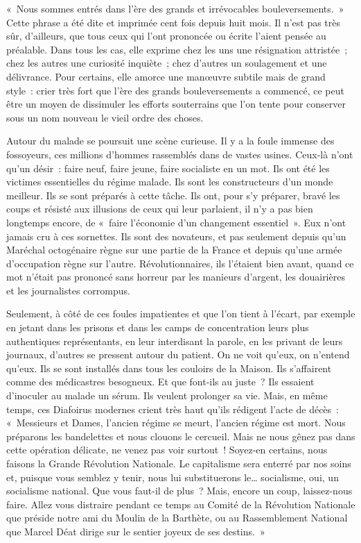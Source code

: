 \documentclass[french,twoside]{book} %
\newcommand\chaptercont{} %
\begin{document}
\chaptercont
\noindent « Nous sommes entrés dans l’ère des grands et irrévocables bouleversements. » Cette phrase a été dite et imprimée cent fois depuis huit mois. Il n’est pas très sûr, d’ailleurs, que tous ceux qui l’ont prononcée ou écrite l’aient pensée au préalable. Dans tous les cas, elle exprime chez les uns une résignation attristée ; chez les autres une curiosité inquiète ; chez d’autres un soulagement et une délivrance. Pour certains, elle amorce une manœuvre subtile mais de grand style : crier très fort que l’ère des grands bouleversements a commencé, ce peut être un moyen de dissimuler les efforts souterrains que l’on tente pour conserver sous un nom nouveau le vieil ordre des choses.\par
Autour du malade se poursuit une scène curieuse. Il y a la foule immense des fossoyeurs, ces millions d’hommes rassemblés dans de vastes usines. Ceux-là n’ont qu’un désir : faire neuf, faire jeune, faire socialiste en un mot. Ils ont été les victimes essentielles du régime malade. Ils sont les constructeurs d’un monde meilleur. Ils se sont préparés à cette tâche. Ils ont, pour s’y préparer, bravé les coups et résisté aux illusions de ceux qui leur parlaient, il n’y a pas bien longtemps encore, de « faire l’économie d’un changement essentiel ». Eux n’ont jamais cru à ces sornettes. Ils sont des novateurs, et pas seulement depuis qu’un Maréchal octogénaire règne sur une partie de la France et depuis qu’une armée d’occupation règne sur l’autre. Révolutionnaires, ils l’étaient bien avant, quand ce mot n’était pas prononcé sans horreur par les manieurs d’argent, les douairières et les journalistes corrompus.\par
Seulement, à côté de ces foules impatientes et que l’on tient à l’écart, par exemple en jetant dans les prisons et dans les camps de concentration leurs plus authentiques représentants,   en leur interdisant la parole, en les privant de leurs journaux, d’autres se pressent autour du patient. On ne voit qu’eux, on n’entend qu’eux. Ils se sont installés dans tous les couloirs de la Maison. Ils s’affairent comme des médicastres besogneux. Et que font-ils au juste ? Ils essaient d’inoculer au malade un sérum. Ils veulent prolonger sa vie. Mais, en même temps, ces Diafoirus modernes crient très haut qu’ils rédigent l’acte de décès : « Messieurs et Dames, l’ancien régime se meurt, l’ancien régime est mort. Nous préparons les bandelettes et nous clouons le cercueil. Mais ne nous gênez pas dans cette opération délicate, ne venez pas voir surtout ! Soyez-en certains, nous faisons la Grande Révolution Nationale. Le capitalisme sera enterré par nos soins et, puisque vous semblez y tenir, nous lui substituerons le… socialisme, oui, un socialisme national. Que vous faut-il de plus ? Mais, encore un coup, laissez-nous faire. Allez vous distraire pendant ce temps au Comité de la Révolution Nationale que préside notre ami du Moulin de la Barthète, ou au Rassemblement National que Marcel Déat dirige sur le sentier joyeux de ses destins. »\par
\end{document}
